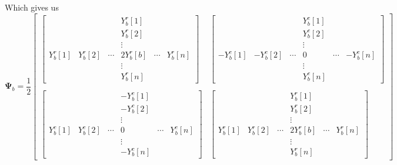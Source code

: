 \documentclass{article}
\begin{document}
Which gives us
\[
    \mathbf{\Psi}_b =
    \frac{1}{2}
    \begin{bmatrix}
        \begin{bmatrix}
            & & & Y_b^r[1] & \\
            & & & Y_b^r[2] & \\
            & & & \vdots & \\
            Y_b^r[1] & Y_b^r[2] & \cdots & 2 Y_b^r[b] & \cdots & Y_b^r[n]\\
            & & & \vdots & \\
            & & & Y_b^r[n] &
        \end{bmatrix} &
        \begin{bmatrix}
            & & & Y_b^c[1] & \\
            & & & Y_b^c[2] & \\
            & & & \vdots & \\
            -Y_b^c[1] & -Y_b^c[2] & \cdots & 0 & \cdots & -Y_b^c[n]\\
            & & & \vdots & \\
            & & & Y_b^c[n] &
        \end{bmatrix} \\ \\
        \begin{bmatrix}
            & & & -Y_b^c[1] & \\
            & & & -Y_b^c[2] & \\
            & & & \vdots & \\
            Y_b^c[1] & Y_b^c[2] & \cdots & 0 & \cdots & Y_b^c[n]\\
            & & & \vdots & \\
            & & & -Y_b^c[n] &
        \end{bmatrix} &
        \begin{bmatrix}
            & & & Y_b^r[1] & \\
            & & & Y_b^r[2] & \\
            & & & \vdots & \\
            Y_b^r[1] & Y_b^r[2] & \cdots & 2 Y_b^r[b] & \cdots & Y_b^r[n]\\
            & & & \vdots & \\
            & & & Y_b^r[n] &
        \end{bmatrix}
    \end{bmatrix}
\]
\end{document}
